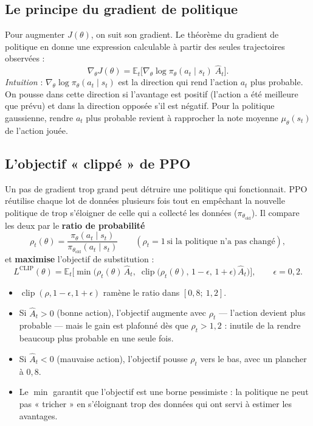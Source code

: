 \documentclass[11pt,a4paper]{article}
\newcommand{\E}{\mathbb{E}}
\begin{document}
\subsection{Le principe du gradient de politique}
Pour augmenter \(J(\theta)\), on suit son gradient. Le théorème du gradient de politique en donne une expression
calculable à partir des seules trajectoires observées :
\begin{equation}
  \nabla_\theta J(\theta)=\E_{t}\big[\nabla_\theta\log\pi_\theta(a_t\mid s_t)\;\hat A_t\big].
\end{equation}
\emph{Intuition} : \(\nabla_\theta\log\pi_\theta(a_t\mid s_t)\) est la direction qui rend l'action \(a_t\) plus
probable. On pousse dans cette direction si l'avantage est positif (l'action a été meilleure que prévu) et dans la
direction opposée s'il est négatif. Pour la politique gaussienne, rendre \(a_t\) plus probable revient à rapprocher
la note moyenne \(\mu_\theta(s_t)\) de l'action jouée.

\subsection{L'objectif « clippé » de PPO}
Un pas de gradient trop grand peut détruire une politique qui fonctionnait. PPO réutilise chaque lot de données
plusieurs fois tout en empêchant la nouvelle politique de trop s'éloigner de celle qui a collecté les données
(\(\pi_{\theta_{\text{old}}}\)). Il compare les deux par le \textbf{ratio de probabilité}
\begin{equation}
  \rho_t(\theta)=\frac{\pi_\theta(a_t\mid s_t)}{\pi_{\theta_{\text{old}}}(a_t\mid s_t)}
  \qquad(\rho_t=1\ \text{si la politique n'a pas changé}),
\end{equation}
et \textbf{maximise} l'objectif de substitution :
\begin{equation}
  \boxed{\;L^{\text{CLIP}}(\theta)=\E_t\Big[\min\big(\rho_t(\theta)\,\hat A_t,\;
  \operatorname{clip}\big(\rho_t(\theta),\,1-\epsilon,\,1+\epsilon\big)\,\hat A_t\big)\Big],\qquad \epsilon=0{,}2.\;}
\end{equation}
\begin{itemize}
  \item \(\operatorname{clip}(\rho,1-\epsilon,1+\epsilon)\) ramène le ratio dans \([0{,}8;\ 1{,}2]\).
  \item Si \(\hat A_t>0\) (bonne action), l'objectif augmente avec \(\rho_t\) — l'action devient plus probable — mais
        le gain est plafonné dès que \(\rho_t>1{,}2\) : inutile de la rendre beaucoup plus probable en une seule fois.
  \item Si \(\hat A_t<0\) (mauvaise action), l'objectif pousse \(\rho_t\) vers le bas, avec un plancher à \(0{,}8\).
  \item Le \(\min\) garantit que l'objectif est une borne pessimiste : la politique ne peut pas « tricher » en
        s'éloignant trop des données qui ont servi à estimer les avantages.
\end{itemize}
\end{document}
